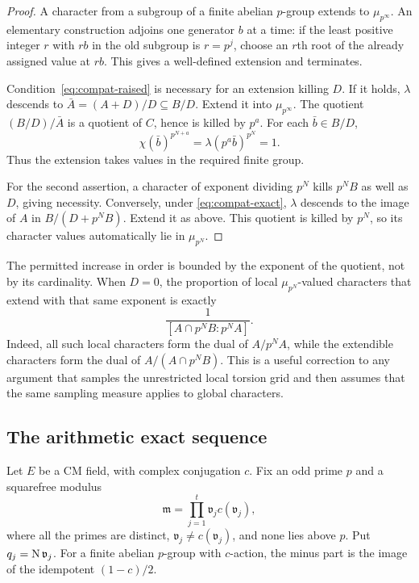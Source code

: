\begin{proof}
A character from a subgroup of a finite abelian $p$-group extends to $\mu_{p^\infty}$. An elementary construction adjoins one generator $b$ at a time: if the least positive integer $r$ with $rb$ in the old subgroup is $r=p^j$, choose an $r$th root of the already assigned value at $rb$. This gives a well-defined extension and terminates.

Condition~\eqref{eq:compat-raised} is necessary for an extension killing $D$. If it holds, $\lambda$ descends to $\bar A=(A+D)/D\subseteq B/D$. Extend it into $\mu_{p^\infty}$. The quotient $(B/D)/\bar A$ is a quotient of $C$, hence is killed by $p^a$. For each $\bar b\in B/D$,
\[
 \chi(\bar b)^{p^{N+a}}
 =\lambda(p^a\bar b)^{p^N}=1.
\]
Thus the extension takes values in the required finite group.

For the second assertion, a character of exponent dividing $p^N$ kills $p^NB$ as well as $D$, giving necessity. Conversely, under \eqref{eq:compat-exact}, $\lambda$ descends to the image of $A$ in $B/(D+p^NB)$. Extend it as above. This quotient is killed by $p^N$, so its character values automatically lie in $\mu_{p^N}$.
\end{proof}

The permitted increase in order is bounded by the exponent of the quotient, not by its cardinality. When $D=0$, the proportion of local $\mu_{p^N}$-valued characters that extend with that same exponent is exactly
\begin{equation}\label{eq:proportion}
 \frac{1}{[A\cap p^NB:p^NA]}.
\end{equation}
Indeed, all such local characters form the dual of $A/p^NA$, while the extendible characters form the dual of $A/(A\cap p^NB)$. This is a useful correction to any argument that samples the unrestricted local torsion grid and then assumes that the same sampling measure applies to global characters.

\subsection{The arithmetic exact sequence}

Let $E$ be a CM field, with complex conjugation $c$. Fix an odd prime $p$ and a squarefree modulus
\[
 \mathfrak m=\prod_{j=1}^t\mathfrak v_jc(\mathfrak v_j),
\]
where all the primes are distinct, $\mathfrak v_j\ne c(\mathfrak v_j)$, and none lies above $p$. Put $q_j=\operatorname{N}\mathfrak v_j$. For a finite abelian $p$-group with $c$-action, the minus part is the image of the idempotent $(1-c)/2$.

